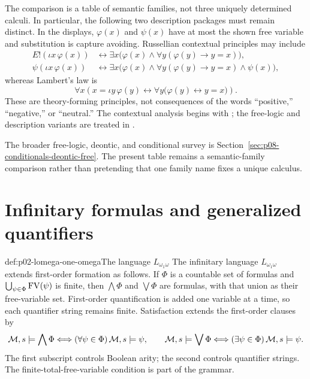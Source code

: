 The comparison is a table of semantic families, not three uniquely determined
calculi.  In particular, the following two description packages must remain
distinct.  In the displays, \(\varphi(x)\) and \(\psi(x)\) have at most the
shown free variable and substitution is capture avoiding.  Russellian
contextual principles may include
\[
\begin{aligned}
 E!(\iota x\,\varphi(x))
 &\leftrightarrow
 \exists x\bigl(\varphi(x)\land
   \forall y(\varphi(y)\to y=x)\bigr),\\
 \psi(\iota x\,\varphi(x))
 &\leftrightarrow
 \exists x\bigl(\varphi(x)\land
   \forall y(\varphi(y)\to y=x)\land\psi(x)\bigr),
\end{aligned}
\]
whereas Lambert's law is
\[
 \forall x\left(
   x=\iota y\,\varphi(y)
   \leftrightarrow
   \forall y\bigl(\varphi(y)\leftrightarrow y=x\bigr)
 \right).
\]
These are theory-forming principles, not consequences of the words
``positive,'' ``negative,'' or ``neutral.''  The contextual analysis begins
with \cite{Russell1905}; the free-logic and description variants are treated
in \cite{Lambert1967,Bencivenga1986,Lehmann2002,GratzlPavlovicNolt2025}.

The broader free-logic, deontic, and conditional survey is
Section~\ref{sec:p08-conditionals-deontic-free}.  The present table remains a
semantic-family comparison rather than pretending that one family name fixes a
unique calculus.

\section{Infinitary formulas and generalized quantifiers}
\label{sec:p02-infinitary-generalized}

\begin{hbdefinition}{def:p02-lomega-one-omega}{The language \(L_{\omega_1\omega}\)}
The infinitary language \(L_{\omega_1\omega}\) extends first-order formation
as follows.  If \(\Phi\) is a countable set of formulas and
\(\bigcup_{\psi\in\Phi}\operatorname{FV}(\psi)\) is finite, then
\(\bigwedge\Phi\) and \(\bigvee\Phi\) are formulas, with that union as their
free-variable set.  First-order quantification is added one variable at a time,
so each quantifier string remains finite.  Satisfaction extends the
first-order clauses by
\[
 \mathcal M,s\models\bigwedge\Phi
 \Longleftrightarrow (\forall\psi\in\Phi)\,\mathcal M,s\models\psi,
 \qquad
 \mathcal M,s\models\bigvee\Phi
 \Longleftrightarrow (\exists\psi\in\Phi)\,\mathcal M,s\models\psi.
\]
The first subscript controls Boolean arity; the second controls quantifier
strings.  The finite-total-free-variable condition is part of the grammar.
\end{hbdefinition}

